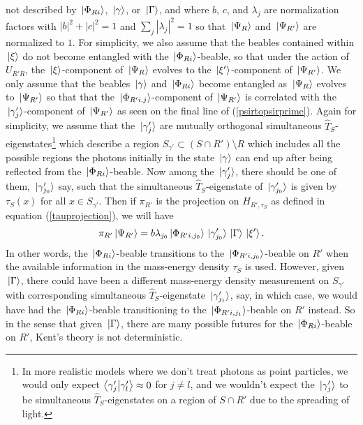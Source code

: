 not described by $\ket*{\Phi_{Ri}}$, $\ket*{\gamma}$, or $\ket*{\Gamma}$, and where $b$, $c$, and $\lambda_j$ are normalization factors with $|b|^2+|c|^2=1$ and $\sum_j |\lambda_j|^2=1$ so that $\ket*{\Psi_{R}}$ and $\ket*{\Psi_{R'}}$ are normalized to $1$. 
For simplicity, we also assume that the beables contained within $\ket*{\xi}$ do not become entangled with the $\ket*{\Phi_{Ri}}$-beable, so that under the action of $U_{R'R}$, the $\ket*{\xi}$-component of $\ket*{\Psi_{R}}$ evolves to the $\ket*{\xi'}$-component of $\ket*{\Psi_{R'}}$. We only assume that the beables $\ket*{\gamma}$ and $\ket*{\Phi_{Ri}}$ become entangled as $\ket*{\Psi_{R}}$ evolves to $\ket*{\Psi_{R'}}$ so that  that the $\ket*{\Phi_{R'i, j}}$-component of $\ket*{\Psi_{R'}}$ is correlated with the $\ket*{\gamma_{j}'}$-component of $\ket*{\Psi_{R'}}$ as seen on the final line of (\ref{psirtopsirprime}). Again for simplicity, we assume that the $\ket*{\gamma_{j}'}$ are mutually orthogonal simultaneous $\hat{T}_S$-eigenstates\footnote{In more realistic models where we don't treat photons as point particles, we would only expect $\ip{\gamma_{j}'}{\gamma_{l}'}\approx 0$ for $j\neq l$, and we wouldn't expect the $\ket*{\gamma_{j}'}$ to be simultaneous $\hat{T}_S$-eigenstates on a region of $S\cap R'$  due to the spreading of light.} which  describe a region  $S_{\gamma'}\subset(S\cap R')\setminus R$ which includes all the possible regions the photons initially in the state $\ket*{\gamma}$ can end up after being reflected from the $\ket*{\Phi_{Ri}}$-beable. Now among the $\ket*{\gamma_{j}'}$, there should be one of them, $\ket*{\gamma_{j_0}'}$ say, such that the simultaneous $\hat{T}_S$-eigenstate of $\ket*{\gamma_{j_0}'}$ is given by $\tau_S(x)$ for all $x\in S_{\gamma'}$. Then if $\pi_{R'}$ is the projection on $H_{R',\tau_S}$ as defined in equation (\ref{tauprojection}), we will have 
$$\pi_{R'}\ket*{\Psi_{R'}}=b\lambda_{j_0}\ket*{\Phi_{R'i,j_0}}\ket*{\gamma_{j_0}'}\ket*{\Gamma}\ket*{\xi'}.$$
In other words, the $\ket*{\Phi_{Ri}}$-beable transitions to the $\ket*{\Phi_{R'i,j_0}}$-beable on $R'$ when the available information in the mass-energy density $\tau_S$ is used. However, given $\ket*{\Gamma}$, there could have been a different mass-energy density measurement on $S_{\gamma'}$ with corresponding simultaneous $\hat{T}_S$-eigenstate $\ket*{\gamma_{j_1}'}$, say, in which case, we would have had the $\ket*{\Phi_{Ri}}$-beable transitioning to the $\ket*{\Phi_{R'i,j_1}}$-beable on $R'$ instead.
So in the sense that given $\ket*{\Gamma}$, there are many possible futures for the $\ket*{\Phi_{Ri}}$-beable on $R'$,  Kent's theory is not deterministic.


